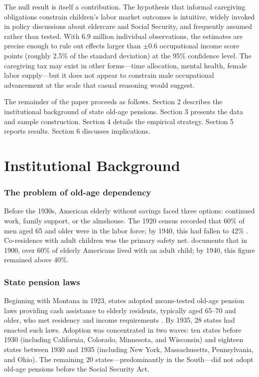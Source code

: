 \documentclass[12pt]{article}
\begin{document}
The null result is itself a contribution. The hypothesis that informal caregiving obligations constrain children's labor market outcomes is intuitive, widely invoked in policy discussions about eldercare and Social Security, and frequently assumed rather than tested. With 6.9 million individual observations, the estimates are precise enough to rule out effects larger than $\pm 0.6$ occupational income score points (roughly 2.5\% of the standard deviation) at the 95\% confidence level. The caregiving tax may exist in other forms---time allocation, mental health, female labor supply---but it does not appear to constrain male occupational advancement at the scale that casual reasoning would suggest.

The remainder of the paper proceeds as follows. Section 2 describes the institutional background of state old-age pensions. Section 3 presents the data and sample construction. Section 4 details the empirical strategy. Section 5 reports results. Section 6 discusses implications.

\section{Institutional Background}

\subsubsection*{The problem of old-age dependency} Before the 1930s, American elderly without savings faced three options: continued work, family support, or the almshouse. The 1920 census recorded that 60\% of men aged 65 and older were in the labor force; by 1940, this had fallen to 42\% \citep{costa1998}. Co-residence with adult children was the primary safety net. \citet{ruggles2007} documents that in 1900, over 60\% of elderly Americans lived with an adult child; by 1940, this figure remained above 40\%.

\subsubsection*{State pension laws} Beginning with Montana in 1923, states adopted means-tested old-age pension laws providing cash assistance to elderly residents, typically aged 65--70 and older, who met residency and income requirements \citep{epstein1933, gratton1996}. By 1935, 28 states had enacted such laws. Adoption was concentrated in two waves: ten states before 1930 (including California, Colorado, Minnesota, and Wisconsin) and eighteen states between 1930 and 1935 (including New York, Massachusetts, Pennsylvania, and Ohio). The remaining 20 states---predominantly in the South---did not adopt old-age pensions before the Social Security Act.
\end{document}
